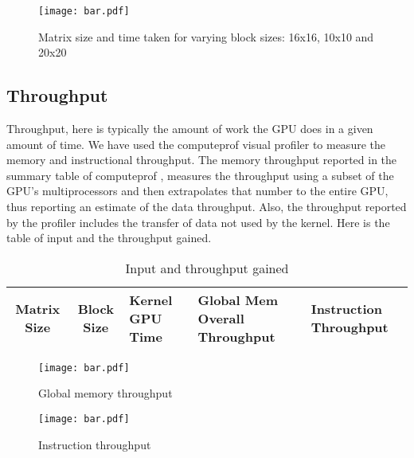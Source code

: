 \documentclass[10pt, twocolumn]{article}
\begin{document}
    \begin{center}
    \begin{figure}
        \texttt{[image: bar.pdf]}
        \caption{Matrix size and time taken for varying block sizes: 16x16, 10x10 and 20x20}
        \label{fig:time_taken}
    \end{figure}
    \end{center}

    \subsection{Throughput}
    Throughput, here is typically the amount of work the GPU does in a given amount of time.
    We have used the computeprof visual profiler to measure the memory and instructional throughput.
    The memory throughput reported in the summary table of computeprof ,  measures  the throughput using a subset of the GPU’s multiprocessors and then extrapolates that number to the entire GPU, thus reporting an estimate of the data throughput.
    Also, the throughput reported by the profiler includes the transfer of data not used by the kernel.
    Here is the table of input and the throughput gained.

    \begin{table}\footnotesize
    \centering
        \begin{tabular}{ | c | c | p{1.2cm} | p{1.5cm} | p{1.0cm} | }
        \hline
        Matrix Size & Block Size & Kernel GPU Time & Global Mem Overall Throughput & Instruction Throughput \\
        \hline
        \end{tabular}
        \caption{Input and throughput gained}
        \label{tab:input_throughput}
    \end{table}

    \begin{center}
    \begin{figure}
        \texttt{[image: bar.pdf]}
        \caption{Global memory throughput}
        \label{fig:global_mem_throughput}
    \end{figure}
    \end{center}


    \begin{center}
    \begin{figure}
        \texttt{[image: bar.pdf]}
        \caption{Instruction throughput}
        \label{fig:instruction_throughput}
    \end{figure}
    \end{center}
\end{document}
